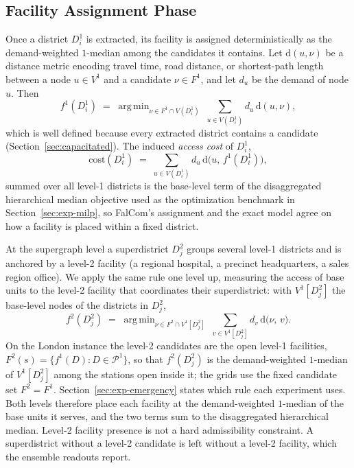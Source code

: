 \documentclass[11pt]{article}
\theoremstyle{definition}
\begin{document}
\subsection{Facility Assignment Phase}
\label{sec:facility}
Once a district $D^1_i$ is extracted, its facility is assigned deterministically as the demand-weighted $1$-median among the candidates it contains. Let $\mathrm{d}(u, \nu)$ be a distance metric encoding travel time, road distance, or shortest-path length between a node $u \in V^1$ and a candidate $\nu \in F^1$, and let $d_u$ be the demand of node $u$. Then
\begin{equation}\label{eq:facility-assign}
    f^{1}(D^1_i) \;=\; \mathop{\mathrm{arg\,min}}_{\nu \in F^1 \cap V(D^1_i)} \; \sum_{u \in V(D^1_i)} d_u\, \mathrm{d}(u, \nu),
\end{equation}
which is well defined because every extracted district contains a candidate (Section~\ref{sec:capacitated}). The induced \emph{access cost} of $D^1_i$,
\begin{equation}\label{eq:demand-radius}
    \mathrm{cost}(D^1_i) \;=\; \sum_{u \in V(D^1_i)} d_u\, \mathrm{d}\bigl(u,\, f^{1}(D^1_i)\bigr),
\end{equation}
summed over all level-1 districts is the base-level term of the disaggregated hierarchical median objective used as the optimization benchmark in Section~\ref{sec:exp-milp}, so FalCom's assignment and the exact model agree on how a facility is placed within a fixed district.

At the supergraph level a superdistrict $D^2_j$ groups several level-1 districts and is anchored by a level-2 facility (a regional hospital, a precinct headquarters, a sales region office). We apply the same rule one level up, measuring the access of base units to the level-2 facility that coordinates their superdistrict: with $V^1[D^2_j]$ the base-level nodes of the districts in $D^2_j$,
\begin{equation}\label{eq:facility-assign-super}
    f^{2}(D^2_j) \;=\; \mathop{\mathrm{arg\,min}}_{\nu \in F^2 \cap V^1[D^2_j]} \; \sum_{v \in V^1[D^2_j]} d_v\, \mathrm{d}\bigl(\nu,\, v\bigr).
\end{equation}
On the London instance the level-2 candidates are the open level-1 facilities, $F^2(s) = \{f^1(D) : D \in \mathcal{P}^1\}$, so that $f^2(D^2_j)$ is the demand-weighted $1$-median of $V^1[D^2_j]$ among the stations open inside it; the grids use the fixed candidate set $F^2 = F^1$. Section~\ref{sec:exp-emergency} states which rule each experiment uses.
Both levels therefore place each facility at the demand-weighted $1$-median of the base units it serves, and the two terms sum to the disaggregated hierarchical median. Level-2 facility presence is not a hard admissibility constraint. A superdistrict without a level-2 candidate is left without a level-2 facility, which the ensemble readouts report.
\end{document}
